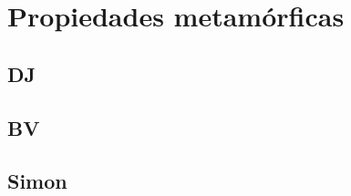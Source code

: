 \cleardoublepage

\chapter{Propiedades metamórficas}
\label{makereference}


\section{DJ}
\n

\section{BV}
\n

\section{Simon}
\n
